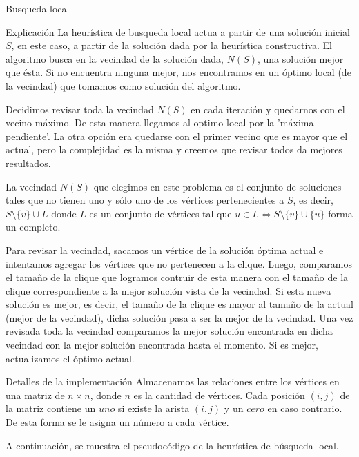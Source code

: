 \begin{section}{Busqueda local}
		\begin{subsection}{Explicación}
			La heurística de busqueda local actua a partir de una solución inicial $S$, en este caso, a partir de la solución dada por la heurística constructiva. El algoritmo busca en la vecindad de la solución dada, $N(S)$, una solución mejor que ésta. Si no encuentra ninguna mejor, nos encontramos en un óptimo local (de la vecindad) que tomamos como solución del algoritmo.
						
			Decidimos revisar toda la vecindad $N(S)$ en cada iteración y quedarnos con el vecino máximo. De esta manera llegamos al optimo local por la 'máxima pendiente'. La otra opción era quedarse con el primer vecino que es mayor que el actual, pero la complejidad es la misma y creemos que revisar todos da mejores resultados.
			
			La vecindad $N(S)$ que elegimos en este problema es el conjunto de soluciones tales que no tienen uno y sólo uno de los vértices pertenecientes a $S$, es decir, $S \setminus \{v\} \cup L$ donde $L$ es un conjunto de vértices tal que $u \in L \Longleftrightarrow S \setminus \{v\} \cup \{u\}$ forma un completo.

			Para revisar la vecindad, sacamos un vértice de la solución óptima actual e intentamos agregar los vértices que no pertenecen a la clique. Luego, comparamos el tamaño de la clique que logramos contruir de esta manera con el tamaño de la clique correspondiente a la mejor solución vista de la vecindad. Si esta nueva solución es mejor, es decir, el tamaño de la clique es mayor al tamaño de la actual (mejor de la vecindad), dicha solución pasa a ser la mejor de la vecindad. Una vez revisada toda la vecindad comparamos la mejor solución encontrada en dicha vecindad con la mejor solución encontrada hasta el momento. Si es mejor, actualizamos el óptimo actual.

		\end{subsection}
		\begin{subsection}{Detalles de la implementación}
			Almacenamos las relaciones entre los vértices en una matriz de $n \times n$, donde $n$ es la cantidad de vértices. Cada posición $(i,j)$ de la matriz contiene un $uno$ si existe la arista $(i,j)$ y un $cero$ en caso contrario. De esta forma se le asigna un número a cada vértice.\VSP

			A continuación, se muestra el pseudocódigo de la heurística de búsqueda local.\\


\end{subsection}
\end{section}
